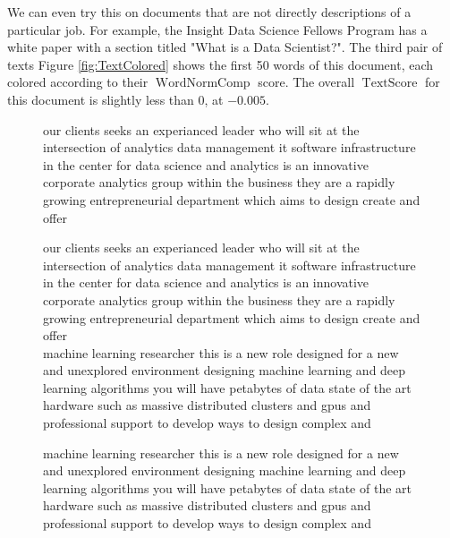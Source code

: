 \documentclass[12pt]{article}
\DeclareMathOperator{\WNp}{WordNormComp}
\DeclareMathOperator{\TS}{TextScore}
\begin{document}
We can even try this on documents that are not directly descriptions of a particular job. For example, the Insight Data Science Fellows Program has a white paper with a section titled "What is a Data Scientist?"\cite{InsightWP}. The third pair of texts Figure \ref{fig:TextColored} shows the first 50 words of this document, each colored according to their $\WNp$ score. The overall $\TS$ for this document is slightly less than 0, at $-0.005$.

\begin{figure}[h]
our clients seeks an experianced leader who will sit at the intersection of analytics data management it software infrastructure in the center for data science and analytics is an innovative corporate analytics group within the business they are a rapidly growing entrepreneurial department which aims to design create and offer

{\color{b1}our} {\color{b2}clients} {\color{o1}seeks} {\color{w}an} {\color{o1}experianced} {\color{b2}leader} {\color{b1}who} {\color{w}will} {\color{o1}sit} {\color{w}at} {\color{b1}the} {\color{o1}intersection} {\color{w}of} {\color{b3}analytics} {\color{b1}data} {\color{b2}management} {\color{b1}it} {\color{o2}software} {\color{o3}infrastructure} {\color{w}in} {\color{b1}the} {\color{b2}center} {\color{w}for} {\color{b1}data} {\color{b2}science} {\color{w}and} {\color{b3}analytics} {\color{w}is} {\color{w}an} {\color{b1}innovative} {\color{b2}corporate} {\color{b3}analytics} {\color{o1}group} {\color{b2}within} {\color{b1}the} {\color{b2}business} {\color{b2}they} {\color{w}are} {\color{w}a} {\color{w}rapidly} {\color{b1}growing} {\color{o1}entrepreneurial} {\color{b1}department} {\color{b1}which} {\color{o1}aims} {\color{w}to} {\color{b1}design} {\color{w}create} {\color{w}and} {\color{o1}offer}\\

machine learning researcher this is a new role designed for a new and unexplored environment designing machine learning and deep learning algorithms you will have petabytes of data state of the art hardware such as massive distributed clusters and gpus and professional support to develop ways to design complex and

{\color{o3}machine} {\color{o3}learning} {\color{o1}researcher} {\color{b1}this} {\color{w}is} {\color{w}a} {\color{b1}new} {\color{b2}role} {\color{b1}designed} {\color{w}for} {\color{w}a} {\color{b1}new} {\color{w}and} {\color{o1}unexplored} {\color{w}environment} {\color{o1}designing} {\color{o3}machine} {\color{o3}learning} {\color{w}and} {\color{o2}deep} {\color{o3}learning} {\color{o2}algorithms} {\color{w}you} {\color{w}will} {\color{o1}have} {\color{o1}petabytes} {\color{w}of} {\color{b1}data} {\color{b1}state} {\color{w}of} {\color{b1}the} {\color{o1}art} {\color{o1}hardware} {\color{o2}such} {\color{w}as} {\color{o1}massive} {\color{o2}distributed} {\color{o4}clusters} {\color{w}and} {\color{o1}gpus} {\color{w}and} {\color{w}professional} {\color{w}support} {\color{w}to} {\color{o1}develop} {\color{b1}ways} {\color{w}to} {\color{b1}design} {\color{b1}complex} {\color{w}and}\\


\end{figure}
\end{document}
